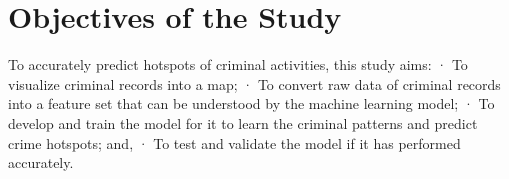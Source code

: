 \section{Objectives of the Study} %

To accurately predict hotspots of criminal activities, this study aims:
·         To visualize criminal records into a map;
·         To convert raw data of criminal records into a feature set that can be understood by the machine learning model;
·         To develop and train the model for it to learn the criminal patterns and predict crime hotspots; and,
·         To test and validate the model if it has performed accurately.
